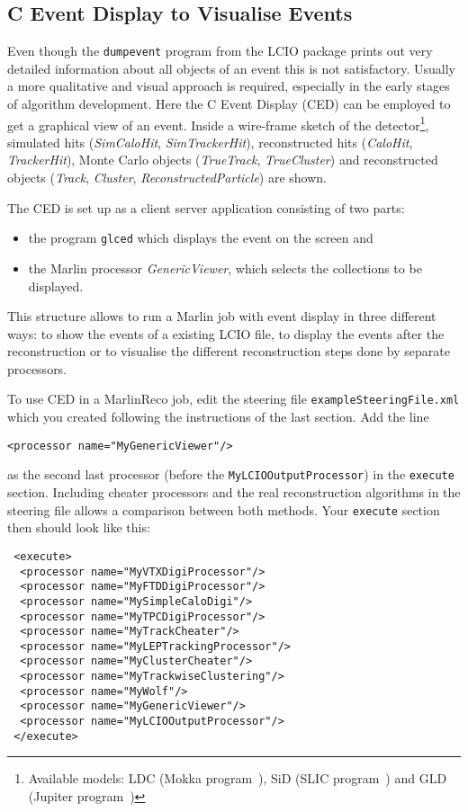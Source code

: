 \subsection{C Event Display to Visualise Events}

Even though the {\tt dumpevent} program from the LCIO package prints out
very detailed information about all objects of an event
this is not satisfactory. Usually a more qualitative and
visual approach is required, especially in the early
stages of algorithm development. Here the C Event Display (CED) can be
employed to get a graphical view of an event. Inside a
wire-frame sketch of the detector\footnote{
      Available models: LDC (Mokka program~\cite{ref_mokka}),
      SiD (SLIC program~\cite{ref_slic}) and
      GLD (Jupiter program~\cite{ref_jupiter})},
simulated hits ({\em SimCaloHit}, {\em SimTrackerHit}), reconstructed hits
({\em CaloHit}, {\em TrackerHit}), Monte Carlo objects
({\em TrueTrack}, {\em TrueCluster}) and reconstructed objects
({\em Track}, {\em Cluster}, {\em ReconstructedParticle}) are shown.

The CED is set up as a client server application consisting of two
parts:
\begin{itemize}
\item the program {\tt glced} which displays the event on the screen and
\item the Marlin processor {\em GenericViewer}, which selects the collections
      to be displayed.
\end{itemize}
This structure allows to run a Marlin job with event display in three
different ways: to show the events of a existing LCIO file,
to display the events after the reconstruction or to visualise the
different reconstruction steps done by separate processors.

To use CED in a MarlinReco job, edit the steering file {\tt exampleSteeringFile.xml}
which you created following the instructions of the last section.
Add the line

\begin{verbatim}
<processor name="MyGenericViewer"/>
\end{verbatim}

as the second last processor (before the {\tt MyLCIOOutputProcessor})
in the {\tt execute} section. Including cheater processors and the
real reconstruction algorithms in the steering file allows a comparison
between both methods. Your {\tt execute} section then should look like
this:

\begin{verbatim}
 <execute>
  <processor name="MyVTXDigiProcessor"/>
  <processor name="MyFTDDigiProcessor"/>
  <processor name="MySimpleCaloDigi"/>
  <processor name="MyTPCDigiProcessor"/>
  <processor name="MyTrackCheater"/>
  <processor name="MyLEPTrackingProcessor"/>
  <processor name="MyClusterCheater"/>
  <processor name="MyTrackwiseClustering"/>
  <processor name="MyWolf"/>
  <processor name="MyGenericViewer"/>
  <processor name="MyLCIOOutputProcessor"/>
 </execute>
\end{verbatim}

